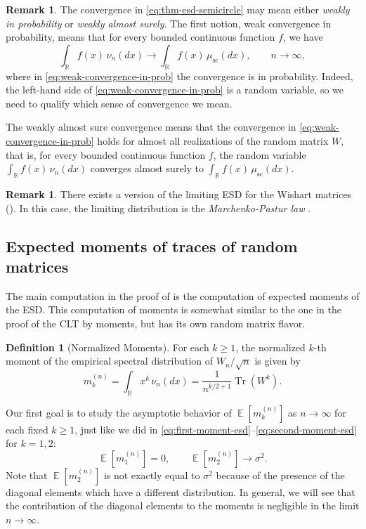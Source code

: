 \documentclass[letterpaper,11pt,oneside,reqno]{article}
\numberwithin{equation}{section}
\theoremstyle{definition}
\newtheorem{definition}[proposition]{Definition}
\newtheorem{remark}[proposition]{Remark}
\begin{document}
\begin{remark}
	The convergence in \eqref{eq:thm-esd-semicircle} may mean either
	\emph{weakly in probability} or \emph{weakly almost surely}.
	The first notion, weak convergence in probability, means that
	for every bounded continuous function $f$,
	we have
	\begin{equation}
		\label{eq:weak-convergence-in-prob}
		\int_{\mathbb{R}} f(x) \, \nu_n(dx) \longrightarrow \int_{\mathbb{R}} f(x) \, \mu_{\mathrm{sc}}(dx),\qquad  n\to\infty,
	\end{equation}
	where in \eqref{eq:weak-convergence-in-prob} the convergence is in probability.
	Indeed, the left-hand side of \eqref{eq:weak-convergence-in-prob}
	is a random variable, so we need to qualify which sense of convergence we mean.

	The weakly almost sure convergence means that
	the convergence in \eqref{eq:weak-convergence-in-prob}
	holds for almost all realizations of the random matrix $W$,
	that is, for every bounded continuous function $f$,
	the random variable
	$\int_{\mathbb{R}} f(x) \, \nu_n(dx)$ converges almost surely to
	$\int_{\mathbb{R}} f(x) \, \mu_{\mathrm{sc}}(dx)$.
\end{remark}

\begin{remark}
	There exists a version of the limiting
	ESD for the Wishart matrices
	().
	In this case, the limiting distribution is the
	\emph{Marchenko-Pastur law}
	\cite{MarchenkoPastur}.
\end{remark}

\subsection{Expected moments of traces of random matrices}

The main computation in the proof of
 is the computation of
expected moments of the ESD.
This computation of moments is somewhat similar
to the one in the proof of the CLT by moments,
but has its own random matrix flavor.

\begin{definition}[Normalized Moments]
For each $k\geq 1$, the normalized $k$-th moment of the empirical spectral distribution of $W_n/\sqrt{n}$ is given by
\[
m_k^{(n)}=\int_{\mathbb{R}} x^k\,\nu_n(dx)
=\frac{1}{n^{k/2+1}}\operatorname{Tr}(W^k).
\]
\end{definition}
Our first goal is to study the asymptotic behavior of
$\operatorname{\mathbb{E}}[m_k^{(n)}]$ as $n\to\infty$ for each fixed
$k\geq 1$, just like we did in
\eqref{eq:first-moment-esd}--\eqref{eq:second-moment-esd}
for $k=1,2$:
\begin{equation*}
	\operatorname{\mathbb{E}}[m_1^{(n)}] = 0, \qquad
	\operatorname{\mathbb{E}}[m_2^{(n)}] \to \sigma^2.
\end{equation*}
Note that $\operatorname{\mathbb{E}}[m_2^{(n)}]$
is not exactly equal to $\sigma^2$ because of the presence of the
diagonal elements which have a different distribution.
In general, we will see that the contribution
of the diagonal elements to the moments is negligible
in the limit $n\to\infty$.
\end{document}
